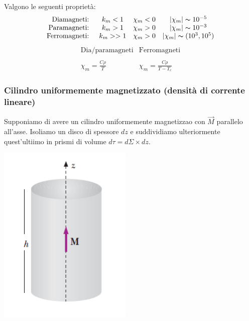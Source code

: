 \documentclass[x11names]{report}
\begin{document}
Valgono le seguenti proprietà:
\[
\begin{array}{rccc}
	\text{Diamagneti: } & k_m < 1 & \chi_m < 0 & |\chi_m| \thicksim 10^{-5}\\
	\text{Paramagneti: } & k_m > 1 & \chi_m > 0 & |\chi_m| \thicksim 10^{-3} \\
	\text{Ferromagneti: }& k_m >> 1 & \chi_m > 0 & |\chi_m| \thicksim (10^{3},10^{5})\\
\end{array}
\]
\[
\begin{array}{cc}
	\text{Dia/paramagneti} & \text{Ferromagneti} \\ & \\
	\chi_m = \frac{C\rho}{T} & \chi_m = \frac{C\rho}{T-T_c}
\end{array}
\]

\subsubsection{Cilindro uniformemente magnetizzato (densità di corrente lineare)}
Supponiamo di avere un cilindro uniformemente magnetizzao con \(\vec{M}\) parallelo all'asse. Isoliamo un disco di spessore \(dz\) e suddividiamo ulteriormente quest'ultiimo in prismi di volume \(d\tau = d\Sigma \times dz\).\vspace{0.5cm}
\begin{minipage}{0.33\textwidth}
	\begin{center}
		\includegraphics[scale=0.5]{img/materia_1.png}
	\end{center}
\end{minipage}
\end{document}
